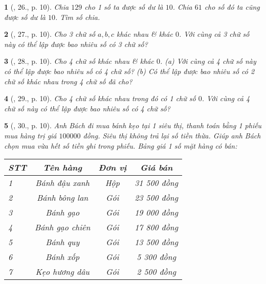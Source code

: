 \documentclass{article}
\newtheorem{baitoan}{}
\begin{document}
\begin{baitoan}[\cite{Tuyen_Toan_6}, 26., p. 10]
	Chia $129$ cho 1 số ta được số dư là $10$. Chia $61$ cho số đó ta cũng được số dư là $10$. Tìm số chia.
\end{baitoan}

\begin{baitoan}[\cite{Tuyen_Toan_6}, 27., p. 10]
	Cho 3 chữ số $a,b,c$ khác nhau \& khác $0$. Với cùng cả 3 chữ số này có thể lập được bao nhiêu số có 3 chữ số?
\end{baitoan}

\begin{baitoan}[\cite{Tuyen_Toan_6}, 28., p. 10]
	Cho 4 chữ số khác nhau \& khác $0$. (a) Với cùng cả 4 chữ số này có thể lập được bao nhiêu số có 4 chữ số? (b) Có thể lập được bao nhiêu số có 2 chữ số khác nhau trong 4 chữ số đã cho?
\end{baitoan}

\begin{baitoan}[\cite{Tuyen_Toan_6}, 29., p. 10]
	Cho 4 chữ số khác nhau trong đó có 1 chữ số $0$. Với cùng cả 4 chữ số này có thể lập được bao nhiêu số có 4 chữ số?
\end{baitoan}

\begin{baitoan}[\cite{Tuyen_Toan_6}, 30., p. 10]
	Anh Bách đi mua bánh kẹo tại 1 siêu thị, thanh toán bằng 1 phiếu mua hàng trị giá $100000$ đồng. Siêu thị không trả lại số tiền thừa. Giúp anh Bách chọn mua vừa hết số tiền ghi trong phiếu. Bảng giá 1 số mặt hàng có bán:
	\begin{table}[H]
		\centering
		\begin{tabular}{|l|c|c|c|}
			\hline
			STT & Tên hàng & Đơn vị & Giá bán \\
			\hline
			1 & Bánh đậu xanh & Hộp & 31 500 đồng \\
			\hline
			2 & Bánh bông lan & Gói & 23 500 đồng \\
			\hline
			3 & Bánh gạo & Gói & 19 000 đồng \\
			\hline
			4 & Bánh gạo chiên & Gói & 17 800 đồng \\
			\hline
			5 & Bánh quy & Gói & 13 500 đồng \\
			\hline
			6 & Bánh xốp & Gói & 5 300 đồng \\
			\hline
			7 & Kẹo hương dâu & Gói & 2 500 đồng \\
			\hline
		\end{tabular}
	\end{table}
\end{baitoan}
\end{document}
